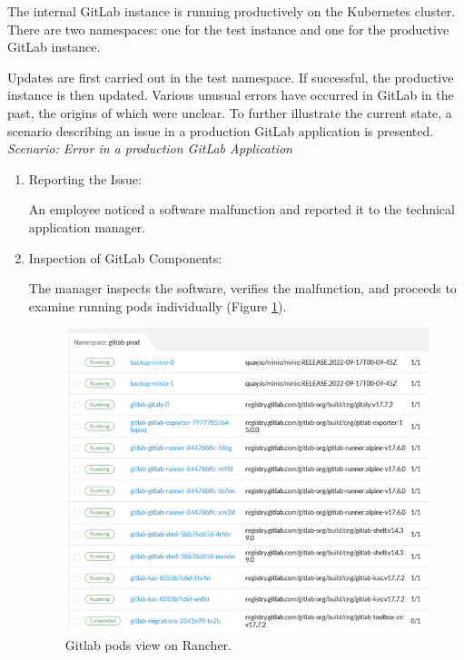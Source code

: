 \documentclass[../main.tex]{subfiles}
\begin{document}
The internal GitLab instance is running productively on the Kubernetes cluster. There are two namespaces: one for the test instance and one for the productive GitLab instance. 

Updates are first carried out in the test namespace. If successful, the productive instance is then updated. Various unusual errors have occurred in GitLab in the past, the origins of which were unclear. To further illustrate the current state, a scenario describing an issue in a production GitLab application is presented. \\

\textit{Scenario: Error in a production GitLab Application}

\begin{enumerate}
    \item Reporting the Issue: 
    
    An employee noticed a software malfunction and reported it to the technical application manager.
    
    \item Inspection of GitLab Components: 
    
    The manager inspects the software, verifies the malfunction, and proceeds to examine running pods individually (Figure \ref{fig:gitlab}).
    
    \begin{figure}[h]
        \centering
        \includegraphics[]{img/2-background/gitlab/gitlab.png}
        \caption{Gitlab pods view on Rancher.}
        \label{fig:gitlab}
    \end{figure}
    

\end{enumerate}
\end{document}
